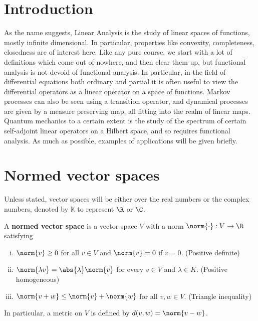 \documentclass{article}
\newcommand{\K}{\mathbb{K}}
\begin{document}
\maketitle

\section{Introduction}
As the name suggests, Linear Analysis is the study of linear spaces of functions, mostly infinite dimensional. In particular, properties like convexity, completeness, closedness are of interest here.
Like any pure course, we start with a lot of definitions which come out of nowhere, and then clear them up, but functional analysis is not devoid of functional analysis. In particular, in the field of differential equations both ordinary and partial it is often useful to view the differential operators as a linear operator on a space of functions. Markov processes can also be seen using a transition operator, and dynamical processes are given by a measure preserving map, all fitting into the realm of linear maps.  Quantum mechanics to a certain extent is the study of the spectrum of certain self-adjoint linear operators on a Hilbert space, and so requires functional analysis.
As much as possible, examples of applications will be given briefly.

\section{Normed vector spaces}
Unless stated, vector spaces will be either over the real numbers or the complex numbers, denoted by $\K$ to represent $\R$ or $\C$.

\begin{defi}
    A \textbf{normed vector space} is a vector space $V$ with a norm $\norm{\cdot}: V \to \R$ satisfying
    \begin{enumerate}[i.]
        \item $\norm{v} \geq 0$ for all $v \in V$ and $\norm{v} = 0$ if $v=0$. (Positive definite)
        \item $\norm{\lambda v} = \abs{\lambda} \norm{v}$ for every $v \in V$ and $\lambda \in K$. (Positive homogeneous)
        \item $\norm{v + w} \leq \norm{v} + \norm{w}$ for all $v, w \in V$. (Triangle inequality)
    \end{enumerate}
\end{defi}
In particular, a metric\label{def:metric-on-vector-space} on $V$ is defined by $d(v, w) = \norm{v - w}$.
\end{document}
